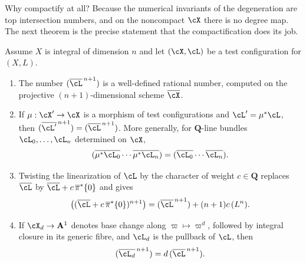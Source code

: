 Why compactify at all?  Because the numerical invariants of the
degeneration are top intersection numbers, and on the noncompact
$\cX$ there is no degree map.  The next theorem is the precise statement
that the compactification does its job.

\begin{theorem}
\label{thm:ch33-intersection-invariance}
Assume $X$ is integral of dimension $n$ and let $(\cX,\cL)$ be a test
configuration for $(X,L)$.
\begin{enumerate}
\item The number $(\overline\cL^{\,n+1})$ is a well-defined rational
 number, computed on the projective $(n+1)$-dimensional scheme
 $\overline\cX$.
\item If $\mu:\cX'\to\cX$ is a morphism of test configurations and
 $\cL'=\mu^\ast\cL$, then
 $({\overline{\cL'}}^{\,n+1})=(\overline\cL^{\,n+1})$.  More generally,
 for $\mathbf Q$-line bundles $\cL_0,\dots,\cL_n$ determined on
 $\cX$,
 \begin{equation}
 \label{eq:ch33-intersection-domination}
  (\overline{\mu^\ast\cL_0}\cdots\overline{\mu^\ast\cL_n})
  =(\overline{\cL_0}\cdots\overline{\cL_n}).
 \end{equation}
\item Twisting the linearization of $\cL$ by the character of weight
 $c\in\mathbf Q$ replaces $\overline\cL$ by
 $\overline\cL+c\,\overline\pi^\ast\{0\}$ and gives
 \begin{equation}
 \label{eq:ch33-intersection-twist}
  \bigl((\overline\cL+c\,\overline\pi^\ast\{0\})^{n+1}\bigr)
  =(\overline\cL^{\,n+1})+(n+1)c\,(L^n).
 \end{equation}
\item If $\cX_d\to\mathbf A^1$ denotes base change along
 $\varpi\mapsto\varpi^d$, followed by integral closure in its generic
 fibre, and $\cL_d$ is the pullback of $\cL$, then
 \begin{equation}
 \label{eq:ch33-intersection-base-change}
  (\overline{\cL_d}^{\,n+1})=d\,(\overline\cL^{\,n+1}).
 \end{equation}
\end{enumerate}
\end{theorem}

